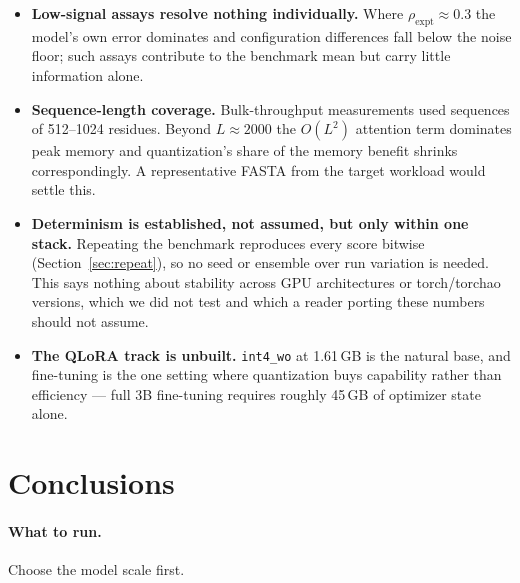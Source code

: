 \documentclass[11pt]{article}
\newcommand{\cfg}[1]{\texttt{#1}}
\begin{document}
\begin{itemize}
  \item \textbf{Low-signal assays resolve nothing individually.} Where
        $\rho_{\text{expt}} \approx 0.3$ the model's own error dominates and
        configuration differences fall below the noise floor; such assays
        contribute to the benchmark mean but carry little information alone.
  \item \textbf{Sequence-length coverage.} Bulk-throughput measurements used
        sequences of 512--1024 residues. Beyond $L \approx 2000$ the $O(L^2)$
        attention term dominates peak memory and quantization's share of the
        memory benefit shrinks correspondingly. A representative FASTA from the
        target workload would settle this.
  \item \textbf{Determinism is established, not assumed, but only within one
        stack.} Repeating the benchmark reproduces every score bitwise
        (Section~\ref{sec:repeat}), so no seed or ensemble over run variation is
        needed. This says nothing about stability across GPU architectures or
        torch/torchao versions, which we did not test and which a reader
        porting these numbers should not assume.
  \item \textbf{The QLoRA track is unbuilt.} \cfg{int4\_wo} at 1.61\,GB is the
        natural base, and fine-tuning is the one setting where quantization buys
        capability rather than efficiency --- full 3B fine-tuning requires
        roughly 45\,GB of optimizer state alone.
\end{itemize}

\section{Conclusions}

\paragraph{What to run.} Choose the model scale first.
\end{document}
